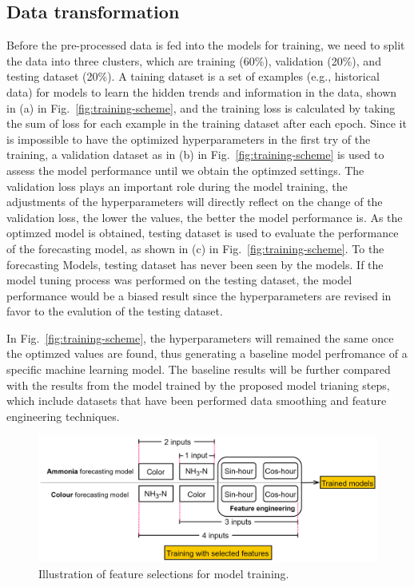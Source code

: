 \subsection{Data transformation}
Before the pre-processed data is fed into the models for training, we need to split the data into three clusters, which are training (60\%), validation (20\%), and testing dataset (20\%). A taining dataset is a set of examples (e.g., historical data) for models to learn the hidden trends and information in the data, shown in (a) in Fig.~\ref{fig:training-scheme}, and the training loss is calculated by taking the sum of loss for each example in the training dataset after each epoch. Since it is impossible to have the optimized hyperparameters in the first try of the training, a validation dataset as in (b) in Fig.~\ref{fig:training-scheme} is used to assess the model performance until we obtain the optimzed settings. The validation loss plays an important role during the model training, the adjustments of the hyperparameters will directly reflect on the change of the validation loss, the lower the values, the better the model performance is. As the optimzed model is obtained, testing dataset is used to evaluate the performance of the forecasting model, as shown in (c) in Fig.~\ref{fig:training-scheme}. To the forecasting Models, testing dataset has never been seen by the models. If the model tuning process was performed on the testing dataset, the model performance would be a biased result since the hyperparameters are revised in favor to the evalution of the testing dataset.

In Fig.~\ref{fig:training-scheme}, the hyperparameters will remained the same once the optimzed values are found, thus generating a baseline model perfromance of a specific machine learning model. The baseline results will be further compared with the results from the model trained by the proposed model trianing steps, which include datasets that have been performed data smoothing and feature engineering techniques.

\begin{figure}[h]
    \centering
    \includegraphics[width=0.8\columnwidth]{imgs/pre-processing/feature-selection.png}
    \caption{Illustration of feature selections for model training.}
    \label{fig:feature-selection}
 \end{figure}


